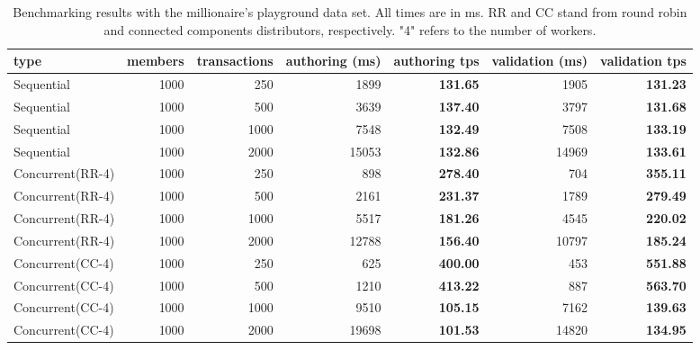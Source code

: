 \begin{table}[h]
\centering
\caption{Benchmarking results with the millionaire's playground data set. All times are in ms. RR and CC stand from round robin and connected components distributors, respectively. "4" refers to the number of workers.}
\label{table:bench1}
\resizebox{\textwidth}{!} {
	\begin{tabular}{l|rr|rr|rr}
	\textbf{type}    & \textbf{members} & \textbf{transactions} & \textbf{authoring (ms)} & authoring tps   & \textbf{validation (ms)} & validation tps  \\ \hline
	Sequential       & 1000             & 250                   & 1899                    & \textbf{131.65} & 1905                     & \textbf{131.23} \\
	Sequential       & 1000             & 500                   & 3639                    & \textbf{137.40} & 3797                     & \textbf{131.68} \\
	Sequential       & 1000             & 1000                  & 7548                    & \textbf{132.49} & 7508                     & \textbf{133.19} \\
	Sequential       & 1000             & 2000                  & 15053                   & \textbf{132.86} & 14969                    & \textbf{133.61} \\ \hline
	Concurrent(RR-4) & 1000             & 250                   & 898                     & \textbf{278.40} & 704                      & \textbf{355.11} \\
	Concurrent(RR-4) & 1000             & 500                   & 2161                    & \textbf{231.37} & 1789                     & \textbf{279.49} \\
	Concurrent(RR-4) & 1000             & 1000                  & 5517                    & \textbf{181.26} & 4545                     & \textbf{220.02} \\
	Concurrent(RR-4) & 1000             & 2000                  & 12788                   & \textbf{156.40} & 10797                    & \textbf{185.24} \\ \hline
	Concurrent(CC-4) & 1000             & 250                   & 625                     & \textbf{400.00} & 453                      & \textbf{551.88} \\
	Concurrent(CC-4) & 1000             & 500                   & 1210                    & \textbf{413.22} & 887                      & \textbf{563.70} \\
	Concurrent(CC-4) & 1000             & 1000                  & 9510                    & \textbf{105.15} & 7162                     & \textbf{139.63} \\
	Concurrent(CC-4) & 1000             & 2000                  & 19698                   & \textbf{101.53} & 14820                    & \textbf{134.95}
	\end{tabular}
}
\end{table}

